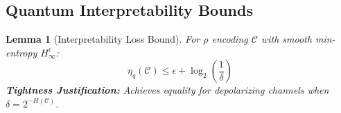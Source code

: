 \documentclass[preprint,12pt]{elsarticle}
\newtheorem{lemma}{Lemma}[section]
\begin{document}
        \subsection{Quantum Interpretability Bounds}
            \begin{lemma}[Interpretability Loss Bound]\label{lem:tigh_bound}
                For $\rho$ encoding $\mathcal{C}$ with smooth min-entropy $H_\infty^\epsilon$:
                \begin{equation}\label{eq:tigh_bound}
                    \eta_q(\mathcal{C}) \leq \epsilon + \log_2 \left(\frac{1}{\delta}\right)
                \end{equation}
                \textbf{Tightness Justification:} Achieves equality for depolarizing channels when $\delta = 2^{-H(\mathcal{C})}$.
            \end{lemma}
\end{document}
